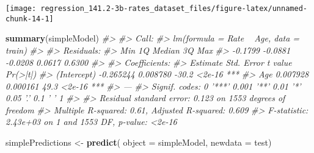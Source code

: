 \documentclass[]{book}
\newenvironment{Shaded}{\begin{snugshade}}{\end{snugshade}}
\newcommand{\CommentTok}[1]{\textcolor[rgb]{0.56,0.35,0.01}{\textit{#1}}}
\newcommand{\DataTypeTok}[1]{\textcolor[rgb]{0.13,0.29,0.53}{#1}}
\newcommand{\DecValTok}[1]{\textcolor[rgb]{0.00,0.00,0.81}{#1}}
\newcommand{\KeywordTok}[1]{\textcolor[rgb]{0.13,0.29,0.53}{\textbf{#1}}}
\newcommand{\NormalTok}[1]{#1}
\newcommand{\OperatorTok}[1]{\textcolor[rgb]{0.81,0.36,0.00}{\textbf{#1}}}
\newcommand{\StringTok}[1]{\textcolor[rgb]{0.31,0.60,0.02}{#1}}
\begin{document}
\begin{Shaded}
\end{Shaded}

\begin{center}\texttt{[image: regression\_141.2-3b-rates\_dataset\_files/figure-latex/unnamed-chunk-14-1]} \end{center}

\begin{Shaded}
\begin{Highlighting}[]
\KeywordTok{summary}\NormalTok{(simpleModel)}
\CommentTok{#> }
\CommentTok{#> Call:}
\CommentTok{#> lm(formula = Rate ~ Age, data = train)}
\CommentTok{#> }
\CommentTok{#> Residuals:}
\CommentTok{#>     Min      1Q  Median      3Q     Max }
\CommentTok{#> -0.1799 -0.0881 -0.0208  0.0617  0.6300 }
\CommentTok{#> }
\CommentTok{#> Coefficients:}
\CommentTok{#>              Estimate Std. Error t value Pr(>|t|)    }
\CommentTok{#> (Intercept) -0.265244   0.008780   -30.2   <2e-16 ***}
\CommentTok{#> Age          0.007928   0.000161    49.3   <2e-16 ***}
\CommentTok{#> ---}
\CommentTok{#> Signif. codes:  0 '***' 0.001 '**' 0.01 '*' 0.05 '.' 0.1 ' ' 1}
\CommentTok{#> }
\CommentTok{#> Residual standard error: 0.123 on 1553 degrees of freedom}
\CommentTok{#> Multiple R-squared:  0.61,   Adjusted R-squared:  0.609 }
\CommentTok{#> F-statistic: 2.43e+03 on 1 and 1553 DF,  p-value: <2e-16}
\end{Highlighting}
\end{Shaded}

\begin{Shaded}
\begin{Highlighting}[]
\NormalTok{simplePredictions <-}\StringTok{ }\KeywordTok{predict}\NormalTok{(}
  \DataTypeTok{object =}\NormalTok{ simpleModel,}
  \DataTypeTok{newdata =}\NormalTok{ test)}
\end{Highlighting}
\end{Shaded}
\end{document}
